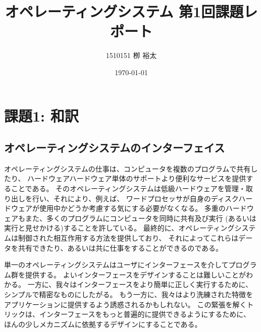 \documentclass[11pt,a4paper, uplatex]{jsarticle}
\title{オペレーティングシステム 第1回課題レポート}
\author{1510151  栁 裕太}
\date{\today}
\begin{document}
\maketitle
\section{課題1: 和訳}
\subsection{オペレーティングシステムのインターフェイス}
オペレーティングシステムの仕事は、コンピュータを複数のプログラムで共有したり、
ハードウェアハードウェア単体のサポートより便利なサービスを提供することである。
そのオペレーティングシステムは低級ハードウェアを管理・取り出しを行い、それにより、例えば、
ワードプロセッサが自身のディスクハードウェアが使用中かどうか考慮する気にする必要がなくなる。
多重のハードウェアもまた、多くのプログラムにコンピュータを同時に共有及び実行
(あるいは実行と見せかける)することを許している。
最終的に、オペレーティングシステムは制御された相互作用する方法を提供しており、
それによってこれらはデータを共有できたり、あるいは共に仕事をすることができるのである。

単一のオペレーティングシステムはユーザにインターフェースを介してプログラム群を提供する。
よいインターフェースをデザインすることは難しいことがわかる。
一方に、我々はインターフェースをより簡単に正しく実行するために、シンプルで精密なものにしたがる。
もう一方に、我々はより洗練された特徴をアプリケーションに提供するよう誘惑されるかもしれない。
この緊張を解くトリックは、インターフェースをもっと普遍的に提供できるようにするために、
ほんの少しメカニズムに依拠するデザインにすることである。
%
%
\end{document}
